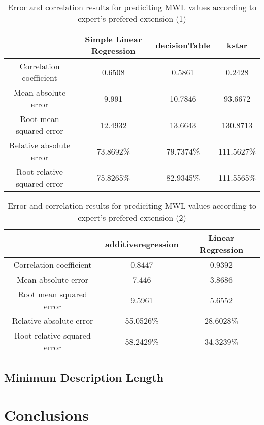 \begin{table}[]
\centering
\begin{tabular}{|c|c|c|c|}
                            & Simple Linear Regression   & decisionTable  & kstar\\ \hline
Correlation coefficient     & 0.6508        & 0.5861         & 0.2428       \\
Mean absolute error         & 9.991        & 10.7846        & 93.6672       \\
Root mean squared error     & 12.4932      & 13.6643       & 130.8713       \\
Relative absolute error     & 73.8692\%    & 79.7374\%        & 111.5627\%  \\
Root relative squared error & 75.8265\%     & 82.9345\%      & 111.5565\%   \\
\end{tabular}
\caption{Error and correlation results for prediciting MWL values according to expert's prefered extension (1)}
\label{tab:mlhybrid1}
\end{table}


\begin{table}[]
\centering
\begin{tabular}{|c|c|c|}
                            & additiveregression & Linear Regression\\ \hline
Correlation coefficient     & 0.8447    & 0.9392 \\
Mean absolute error         & 7.446      & 3.8686 \\
Root mean squared error     & 9.5961    & 5.6552  \\
Relative absolute error     & 55.0526\% & 28.6028\%\\
Root relative squared error & 58.2429\%  & 34.3239\%\\
\end{tabular}
\caption{Error and correlation results for prediciting MWL values according to expert's prefered extension (2)}
\label{tab:mlhybrid2}
\end{table}


\subsection{Minimum Description Length}


\section{Conclusions}

